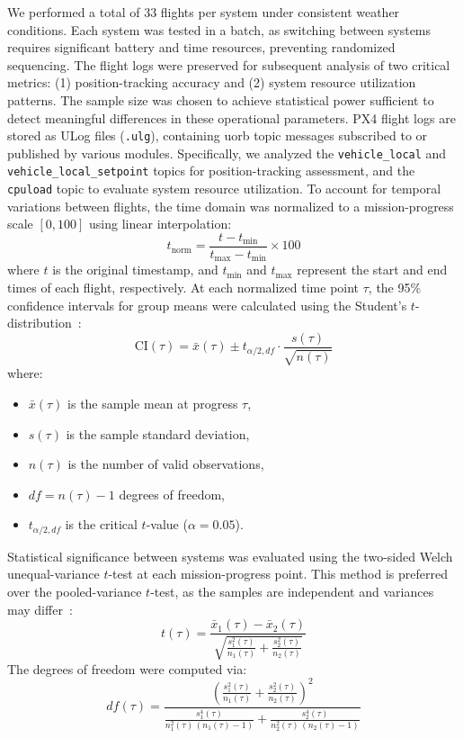 We performed a total of 33 flights per system under consistent
weather conditions. Each system was tested in a batch, as switching
between systems requires significant battery and time resources, preventing
randomized sequencing.
The flight logs were preserved for subsequent analysis of two critical metrics:
(1) position-tracking accuracy and (2) system resource utilization patterns.
The sample size was chosen to achieve statistical power sufficient to detect meaningful
differences in these operational parameters.
%
PX4 flight logs are stored as ULog files (\lstinline{.ulg}), containing
\gls{uorb} topic messages subscribed to or published by various
modules. Specifically, we analyzed the \lstinline{vehicle_local} and
\lstinline{vehicle_local_setpoint} topics for position-tracking assessment, and
the \lstinline{cpuload} topic to evaluate system resource
utilization.
%
To account for temporal variations between flights, the time domain was
normalized to a mission-progress scale $[0, 100]$ using linear interpolation:
\begin{equation}
t_{\text{norm}} = \frac{t - t_{\min}}{t_{\max} - t_{\min}} \times 100
\end{equation}
where $t$ is the original timestamp, and $t_{\min}$ and $t_{\max}$ represent the start and end times of each flight, respectively.
%
At each normalized time point $\tau$, the 95\% confidence intervals for group
means were calculated using the Student's $t$-distribution~\cite{t-test}:
\begin{equation}
\text{CI}(\tau) = \bar{x}(\tau) \pm t_{\alpha/2, df} \cdot \frac{s(\tau)}{\sqrt{n(\tau)}}
\end{equation}
where:
\begin{itemize}
    \item $\bar{x}(\tau)$ is the sample mean at progress $\tau$,
    \item $s(\tau)$ is the sample standard deviation,
    \item $n(\tau)$ is the number of valid observations,
    \item $df = n(\tau) - 1$ degrees of freedom,
    \item $t_{\alpha/2, df}$ is the critical $t$-value ($\alpha = 0.05$).
\end{itemize}

Statistical significance between systems was evaluated using the two-sided
Welch unequal-variance $t$-test at each mission-progress point. This method is
preferred over the pooled-variance $t$-test, as the samples are independent and variances may differ~\cite{welch-t-test}:
\begin{equation}
  \label{eq:welch-t-test}
t(\tau) = \frac{\bar{x}_1(\tau) - \bar{x}_2(\tau)}{\sqrt{\frac{s_1^2(\tau)}{n_1(\tau)} + \frac{s_2^2(\tau)}{n_2(\tau)}}}
\end{equation}
%
The degrees of freedom were computed via:
\begin{equation}
  \label{eq:welch-t-test-df}
df(\tau) = \frac{\left( \frac{s_1^2(\tau)}{n_1(\tau)} + \frac{s_2^2(\tau)}{n_2(\tau)} \right)^2}{\frac{s_1^4(\tau)}{n_1^2(\tau)\,(n_1(\tau)-1)} + \frac{s_2^4(\tau)}{n_2^2(\tau)\,(n_2(\tau)-1)}}
\end{equation}

